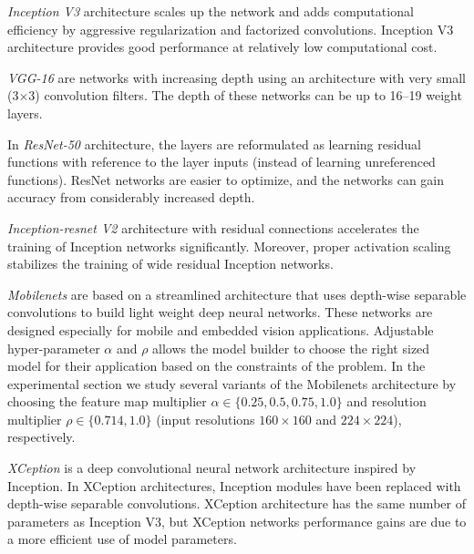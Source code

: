 \documentclass[conference]{IEEEtran}
\begin{document}
\textit{Inception V3} \cite{inceptionv3} architecture scales up the network and adds computational efficiency by aggressive regularization and factorized convolutions. Inception V3 architecture provides good performance at relatively low computational cost.

\textit{VGG-16} \cite{vgg} are networks with increasing depth using an architecture with very small (3$\times$3) convolution filters. The depth of these networks can be up to 16--19 weight layers.

In \textit{ResNet-50} \cite{resnet} architecture, the layers are reformulated as learning residual functions with reference to the layer inputs (instead of learning unreferenced functions). ResNet networks are easier to optimize, and the networks can gain accuracy from considerably increased depth.

\textit{Inception-resnet V2} \cite{inc-resnet} architecture with residual connections accelerates the training of Inception networks significantly. Moreover, proper activation scaling stabilizes the training of wide residual Inception networks.

\textit{Mobilenets} \cite{mobilenets} are based on a streamlined architecture that uses depth-wise separable convolutions to build light weight deep neural networks. These networks are designed especially for mobile and embedded vision applications. Adjustable hyper-parameter $\alpha$ and $\rho$ allows the model builder to choose the right sized model for their application based on the constraints of the problem. 
In the experimental section we study several variants of the Mobilenets architecture by choosing the feature map multiplier $\alpha \in \{0.25, 0.5, 0.75, 1.0\}$ and resolution multiplier $\rho \in \{0.714, 1.0\}$ (input resolutions $160\times 160$ and $224\times 224$), respectively.

\textit{XCeption} \cite{xception} is a deep convolutional neural network architecture inspired by Inception. In XCeption architectures, Inception modules have been replaced with depth-wise separable convolutions. XCeption architecture has the same number of parameters as Inception V3, but XCeption networks performance gains are due to a more efficient use of model parameters.
 
\end{document}
